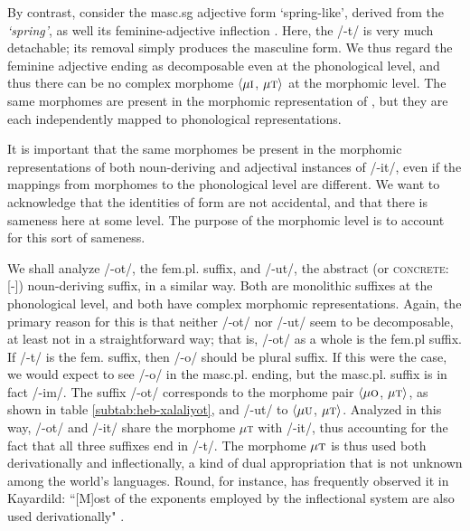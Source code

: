 
  By contrast, consider the masc.sg adjective form \emph{} 
  `spring-like', derived from the \emph{ `spring'}, 
  as well its feminine-adjective inflection  \emph{}. Here, the /-t/ 
  is very much detachable; its removal simply produces the masculine form. We
  thus regard the feminine adjective ending as decomposable even at the 
  phonological level, and thus there can be no complex morphome $\langle \mu\textsc{i}$, 
  $\mu\textsc{t} \rangle$ at the morphomic level. The same morphomes are present in the 
  morphomic representation of \emph{}, but they are each 
  independently mapped to phonological representations.
  
  It is important that the same morphomes be present in the morphomic 
  representations of both noun-deriving and adjectival instances of /-it/, 
  even if the mappings from morphomes to the phonological level are different. We 
  want to acknowledge that the identities of form are not accidental, 
  and that there is sameness here at some level. The purpose of the 
  morphomic level is to account for
  this sort of sameness.
  
 We shall analyze /-ot/, the fem.pl. suffix, and /-ut/, the abstract (or \textsc{concrete:}[-])
 noun-deriving suffix, in a similar way. Both are monolithic suffixes at the phonological
 level, and both have complex morphomic representations. Again, the primary reason for this
 is that neither /-ot/ nor /-ut/ seem to be decomposable, at least not in a straightforward
 way; that is, /-ot/ as a whole is the fem.pl suffix. If /-t/ is the fem. suffix, then
 /-o/ should be plural suffix. If this were the case, we would expect to see
 /-o/ in the masc.pl. ending, but the masc.pl. suffix is in fact /-im/. The suffix /-ot/
 corresponds to the morphome pair $\langle \mu\textsc{o}$, $\mu\textsc{t} \rangle$, 
 as shown in table \ref{subtab:heb-xalaliyot}, and /-ut/ to $\langle \mu\textsc{u}$, 
 $\mu\textsc{t} \rangle$. Analyzed in this way, /-ot/ and /-it/ share the morphome 
 $\mu$\textsc{t} with /-it/, thus accounting for the fact that all three suffixes end 
 in /-t/. The morphome $\mu\textsc{t}$ is thus used both derivationally and 
 inflectionally, a kind of dual appropriation that is not unknown among the world's languages. 
 Round, for instance, has frequently observed it in Kayardild: ``[M]ost of the exponents 
 employed by the inflectional system are also used derivationally" \citep[][p. 13]{round:2015}.
  
